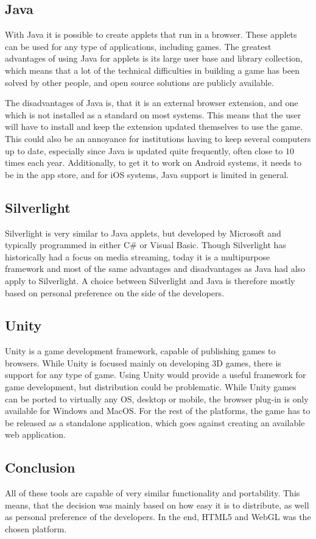 \subsection{Java}
With Java it is possible to create applets that run in a browser.\cite{java13} These applets can be used for any type of applications, including games.
The greatest advantages of using Java for applets is its large user base and library collection, which means that a lot of the technical difficulties in building a game has been solved by other people, and open source solutions are publicly available.

The disadvantages of Java is, that it is an external browser extension, and one which is not installed as a standard on most systems.
This means that the user will have to install and keep the extension updated themselves to use the game. 
This could also be an annoyance for institutions having to keep several computers up to date, especially since Java is updated quite frequently, often close to $10$ times each year.\cite{javahistory13}
Additionally, to get it to work on Android systems, it needs to be in the app store, and for iOS systems, Java support is limited in general.

\subsection{Silverlight}
Silverlight is very similar to Java applets, but developed by Microsoft and typically programmed in either C\# or Visual Basic.\cite{silverlight13}
Though Silverlight has historically had a focus on media streaming, today it is a multipurpose framework and most of the same advantages and disadvantages as Java had also apply to Silverlight.
A choice between Silverlight and Java is therefore mostly based on personal preference on the side of the developers.

\subsection{Unity}
Unity is a game development framework, capable of publishing games to browsers.\cite{unity13} 
While Unity is focused mainly on developing 3D games, there is support for any type of game.
Using Unity would provide a useful framework for game development, but distribution could be problematic.
While Unity games can be ported to virtually any OS, desktop or mobile, the browser plug-in is only available for Windows and MacOS.
For the rest of the platforms, the game has to be released as a standalone application, which goes against creating an available web application.

\subsection{Conclusion}
All of these tools are capable of very similar functionality and portability. This means, that the decision was mainly based on how easy it is to distribute, as well as personal preference of the developers.
In the end, HTML5 and WebGL was the chosen platform.